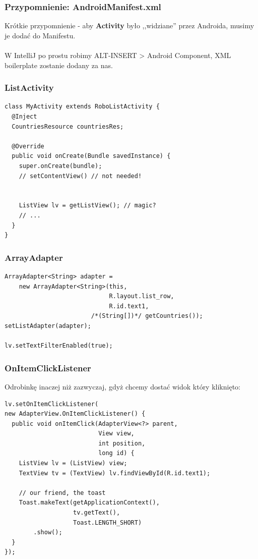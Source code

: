 \begin{frame}\frametitle{Przypomnienie: AndroidManifest.xml}
\begin{center}
Krótkie przypomnienie - aby \textbf{Activity} było ,,widziane'' 
przez Androida, musimy je dodać do Manifestu.
\ \\ 
\ \\ 
\small{W IntelliJ po prostu robimy ALT-INSERT > Android Component, 
XML boilerplate zostanie dodany za nas.}
\end{center}
\end{frame}

\begin{frame}[fragile]\frametitle{ListActivity}
\begin{lstlisting}
class MyActivity extends RoboListActivity {
  @Inject
  CountriesResource countriesRes;
 
  @Override
  public void onCreate(Bundle savedInstance) {
    super.onCreate(bundle);
    // setContentView() // not needed!
    

    ListView lv = getListView(); // magic?
    // ...
  }
}
\end{lstlisting}
\end{frame}

\begin{frame}[fragile]\frametitle{ArrayAdapter}
\begin{lstlisting}
ArrayAdapter<String> adapter = 
    new ArrayAdapter<String>(this, 
                             R.layout.list_row, 
                             R.id.text1, 
                        /*(String[])*/ getCountries());
setListAdapter(adapter);

lv.setTextFilterEnabled(true);
\end{lstlisting}
\end{frame}

\begin{frame}[fragile]\frametitle{\textbf{OnItemClick}Listener}
Odrobinkę inaczej niż zazwyczaj, gdyż chcemy dostać widok który kliknięto:
\begin{lstlisting}
lv.setOnItemClickListener(
new AdapterView.OnItemClickListener() {
  public void onItemClick(AdapterView<?> parent, 
                          View view,
                          int position, 
                          long id) {
    ListView lv = (ListView) view;
    TextView tv = (TextView) lv.findViewById(R.id.text1);

    // our friend, the toast
    Toast.makeText(getApplicationContext(),
                   tv.getText(),
                   Toast.LENGTH_SHORT)
        .show();
  }
});
\end{lstlisting}
\end{frame}

